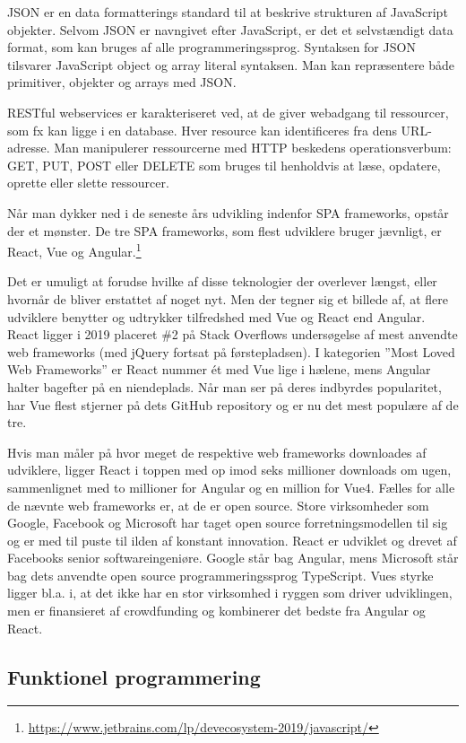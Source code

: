 \documentclass[]{article}
\begin{document}
JSON er en data formatterings standard til at beskrive strukturen af
JavaScript objekter. Selvom JSON er navngivet efter JavaScript, er det
et selvstændigt data format, som kan bruges af alle programmeringssprog.
Syntaksen for JSON tilsvarer JavaScript object og array literal
syntaksen. Man kan repræsentere både primitiver, objekter og arrays med
JSON.

RESTful webservices er karakteriseret ved, at de giver webadgang til
ressourcer, som fx kan ligge i en database. Hver resource kan
identificeres fra dens URL-adresse. Man manipulerer ressourcerne med
HTTP beskedens operationsverbum: GET, PUT, POST eller DELETE som bruges
til henholdvis at læse, opdatere, oprette eller slette ressourcer.

Når man dykker ned i de seneste års udvikling indenfor SPA frameworks,
opstår der et mønster. De tre SPA frameworks, som flest udviklere bruger
jævnligt, er React, Vue og Angular.\footnote{\url{https://www.jetbrains.com/lp/devecosystem-2019/javascript/}}

Det er umuligt at forudse hvilke af disse teknologier der overlever
længst, eller hvornår de bliver erstattet af noget nyt. Men der tegner
sig et billede af, at flere udviklere benytter og udtrykker tilfredshed
med Vue og React end Angular. React ligger i 2019 placeret \#2 på Stack
Overflows undersøgelse af mest anvendte web frameworks (med jQuery
fortsat på førstepladsen). I kategorien ''Most Loved Web Frameworks'' er
React nummer ét med Vue lige i hælene, mens Angular halter bagefter på
en niendeplads. Når man ser på deres indbyrdes popularitet, har Vue
flest stjerner på dets GitHub repository og er nu det mest populære af
de tre.

Hvis man måler på hvor meget de respektive web frameworks downloades af
udviklere, ligger React i toppen med op imod seks millioner downloads om
ugen, sammenlignet med to millioner for Angular og en million for Vue4.
Fælles for alle de nævnte web frameworks er, at de er open source. Store
virksomheder som Google, Facebook og Microsoft har taget open source
forretningsmodellen til sig og er med til puste til ilden af konstant
innovation. React er udviklet og drevet af Facebooks senior
softwareingeniøre. Google står bag Angular, mens Microsoft står bag dets
anvendte open source programmeringssprog TypeScript. Vues styrke ligger
bl.a. i, at det ikke har en stor virksomhed i ryggen som driver
udviklingen, men er finansieret af crowdfunding og kombinerer det bedste
fra Angular og React.

\hypertarget{funktionel-programmering-1}{%
\subsection{Funktionel programmering}\label{funktionel-programmering-1}}
\end{document}
